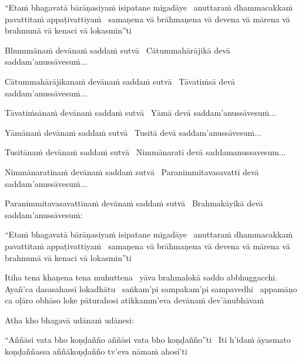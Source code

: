 \begin{pali-hang}
  ``Etaṁ bhagavatā bārāṇasiyaṁ isipatane migadāye \breathmark\ anuttaraṁ dhammacakkaṁ pavattitaṁ appaṭivattiyaṁ \breathmark\ samaṇena vā brāhmaṇena vā devena vā mārena vā brahmunā vā kenaci vā lokasmin''ti
\end{pali-hang}

\begin{pali-hang}
  Bhummānaṁ devānaṁ saddaṁ sutvā \breathmark\ Cātummahārājikā devā saddam'anussāvesuṁ...
\end{pali-hang}

\begin{pali-hang}
  Cātummahārājikanaṁ devānaṁ saddaṁ sutvā \breathmark\ Tāvatiṁsā devā saddam'anussāvesuṁ...
\end{pali-hang}

\begin{pali-hang}
  Tāvatiṁsānaṁ devānaṁ saddaṁ sutvā \breathmark\ Yāmā devā saddam'anussāvesuṁ...
\end{pali-hang}

\begin{pali-hang}
  Yāmānaṁ devānaṁ saddaṁ sutvā \breathmark\ Tusitā devā saddam'anussāvesuṁ...
\end{pali-hang}

\begin{pali-hang}
  Tusitānaṁ devānaṁ saddaṁ sutvā \breathmark\ Nimmānaratī devā saddamanussavesum...
\end{pali-hang}

\begin{pali-hang}
  Nimmānaratīnaṁ devānaṁ saddaṁ sutvā \breathmark\ Paranimmitavasavattī devā saddam'anussāvesuṁ...
\end{pali-hang}

\begin{pali-hang}
  Paranimmitavasavattīnaṁ devānaṁ saddaṁ sutvā \breathmark\ Brahmakāyikā devā saddam'anussāvesuṁ:
\end{pali-hang}

\begin{pali-hang}
  ``Etaṁ bhagavatā bārāṇasiyaṁ isipatane migadāye \breathmark\ anuttaraṁ dhammacakkaṁ pavattitaṁ appaṭivattiyaṁ \breathmark\ samaṇena vā brāhmaṇena vā devena vā mārena vā brahmunā vā kenaci vā lokasmin''ti
\end{pali-hang}

\begin{pali-hang}
  Itiha tena khaṇena tena muhuttena \breathmark\ yāva brahmalokā saddo abbhuggacchi. Ayañ'ca dasasahassī lokadhātu \breathmark\ saṅkam'pi sampakam'pi sampavedhi \breathmark\ appamāṇo ca oḷāro obhāso loke pāturahosi atikkamm'eva devānaṁ dev'ānubhāvaṁ
\end{pali-hang}

Atha kho bhagavā udānaṁ udānesi:

\begin{pali-hang}
  ``Aññāsi vata bho koṇḍañño aññāsi vata bho koṇḍañño''ti \breathmark\ Iti h'idaṁ āyasmato koṇḍaññassa aññākoṇḍañño tv'eva nāmaṁ ahosī'ti
\end{pali-hang}

\suttaRef{[SN 56.11]}
